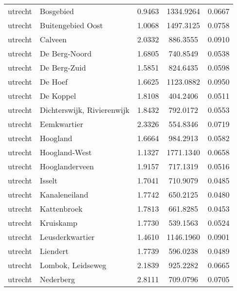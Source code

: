 \begin{longtable}{llccc}
	utrecht       & Bosgebied                        & 0.9463  & 1334.9264 & 0.0667          \\
	utrecht       & Buitengebied Oost                & 1.0068  & 1497.3125 & 0.0758          \\
	utrecht       & Calveen                          & 2.0332  & 886.3555  & 0.0910          \\
	utrecht       & De Berg-Noord                    & 1.6805  & 740.8549  & 0.0538          \\
	utrecht       & De Berg-Zuid                     & 1.5851  & 824.6435  & 0.0598          \\
	utrecht       & De Hoef                          & 1.6625  & 1123.0882 & 0.0950          \\
	utrecht       & De Koppel                        & 1.8108  & 404.2406  & 0.0511          \\
	utrecht       & Dichterswijk, Rivierenwijk       & 1.8432  & 792.0172  & 0.0553          \\
	utrecht       & Eemkwartier                      & 2.3326  & 554.8346  & 0.0719          \\
	utrecht       & Hoogland                         & 1.6664  & 984.2913  & 0.0582          \\
	utrecht       & Hoogland-West                    & 1.1327  & 1771.1340 & 0.0658          \\
	utrecht       & Hooglanderveen                   & 1.9157  & 717.1319  & 0.0516          \\
	utrecht       & Isselt                           & 1.7041  & 710.9079  & 0.0485          \\
	utrecht       & Kanaleneiland                    & 1.7742  & 650.2125  & 0.0480          \\
	utrecht       & Kattenbroek                      & 1.7813  & 661.8285  & 0.0453          \\
	utrecht       & Kruiskamp                        & 1.7730  & 539.1563  & 0.0524          \\
	utrecht       & Leusderkwartier                  & 1.4610  & 1146.1960 & 0.0901          \\
	utrecht       & Liendert                         & 1.7739  & 596.0238  & 0.0489          \\
	utrecht       & Lombok, Leidseweg                & 2.1839  & 925.2282  & 0.0665          \\
	utrecht       & Nederberg                        & 2.8111  & 709.0796  & 0.0705          \\

\end{longtable}

